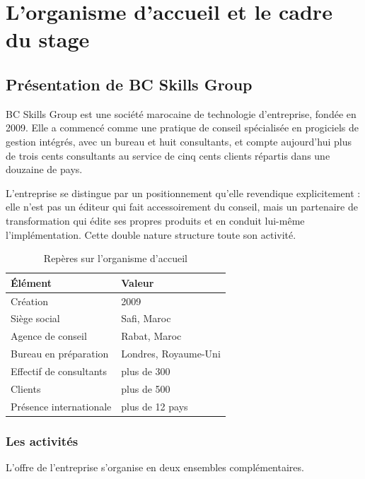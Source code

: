 \documentclass[12pt,a4paper]{report}
\begin{document}
\chapter{L'organisme d'accueil et le cadre du stage}

\section{Présentation de BC Skills Group}

BC Skills Group est une société marocaine de technologie d'entreprise, fondée
en 2009. Elle a commencé comme une pratique de conseil spécialisée en
progiciels de gestion intégrés, avec un bureau et huit consultants, et compte
aujourd'hui plus de trois cents consultants au service de cinq cents clients
répartis dans une douzaine de pays.

L'entreprise se distingue par un positionnement qu'elle revendique
explicitement : elle n'est pas un éditeur qui fait accessoirement du conseil,
mais un partenaire de transformation qui édite ses propres produits et en
conduit lui-même l'implémentation. Cette double nature structure toute son
activité.

\begin{table}[H]
\centering
\caption{Repères sur l'organisme d'accueil}
\label{tab:reperes}
\begin{tabular}{@{}ll@{}}
\toprule
\textbf{Élément} & \textbf{Valeur} \\
\midrule
Création & 2009 \\
Siège social & Safi, Maroc \\
Agence de conseil & Rabat, Maroc \\
Bureau en préparation & Londres, Royaume-Uni \\
Effectif de consultants & plus de 300 \\
Clients & plus de 500 \\
Présence internationale & plus de 12 pays \\
\bottomrule
\end{tabular}
\end{table}

\subsection{Les activités}

L'offre de l'entreprise s'organise en deux ensembles complémentaires.
\end{document}
